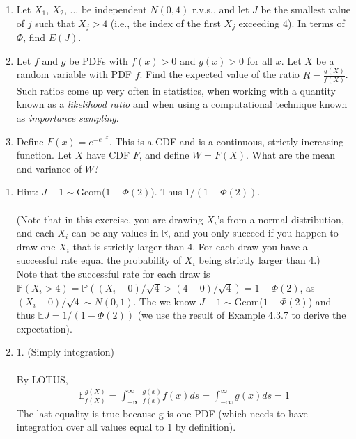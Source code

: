 

\setcounter{theorem}{54}
\begin{exercise}[BH.5.55] \begin{enumerate}
    \item Let $X_1$, $X_2$, ... be independent $N(0,4)$ r.v.s., and let $J$ be the smallest value of $j$ such that $X_j > 4$ (i.e., the index of the first $X_j$ exceeding 4). In terms of $\Phi$, find $E(J)$.
    \item Let $f$ and $g$ be PDFs with $f(x) > 0$ and $g(x) > 0$ for all $x$. Let $X$ be a random variable with PDF $f$. Find the expected value of the ratio $R = \frac{g(X)}{f(X)}$. Such ratios come up very often in statistics, when working with a quantity known as a \emph{likelihood ratio} and when using a computational technique known as \emph{importance sampling}.
    \item Define $F(x) = e^{-e^{-x}}$. This is a CDF and is a continuous, strictly increasing function. Let $X$ have CDF $F$, and define $W = F(X)$. What are the mean and variance of $W$?
\end{enumerate}
\begin{solution}
    \begin{enumerate}
	    \item Hint: $J-1\sim$Geom($1-\Phi(2)$). Thus $1/(1-\Phi(2))$.\\~\\
    	(Note that in this exercise, you are drawing $X_i$'s from a normal distribution, and each $X_i$ can be any values in $\mathbb{R}$, and you only succeed if you happen to draw one $X_i$ that is strictly larger than 4. For each draw you have a successful rate equal the probability of $X_i$ being strictly larger than 4.)\\
    	
    	Note that the successful rate for each draw is $\mathbb{P}\left(X_i >4 \right)=\mathbb{P}\left((X_i-0)/\sqrt{4} >(4-0)/\sqrt{4} \right) =1-\Phi(2)$, as $(X_i-0)/\sqrt{4}\sim N(0,1)$. The we know  $J-1\sim$Geom($1-\Phi(2)$) and thus $\mathbb{E}J=1/(1-\Phi(2))$ (we use the result of Example 4.3.7 to derive the expectation). 
    	\item 1. (Simply integration)\\~\\
    	By LOTUS,
    	\begin{align*}
    		\mathbb{E}\frac{g(X)}{f(X)} = \int_{-\infty}^{\infty} \frac{g(x)}{f(x)} f(x) ds= \int_{-\infty}^{\infty} {g(x)}  ds=1
    	\end{align*}
    	The last equality is true because g is one PDF (which needs to have integration over all values equal to 1 by definition). 
    	

\end{enumerate}
\end{solution}
\end{exercise}
